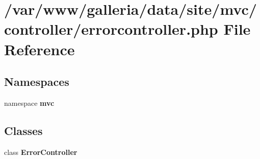\section{/var/www/galleria/data/site/mvc/controller/errorcontroller.php File Reference}
\label{errorcontroller_8php}
\subsection*{Namespaces}
\begin{CompactItemize}
\item 
namespace {\bf mvc}
\end{CompactItemize}
\subsection*{Classes}
\begin{CompactItemize}
\item 
class {\bf ErrorController}
\end{CompactItemize}
